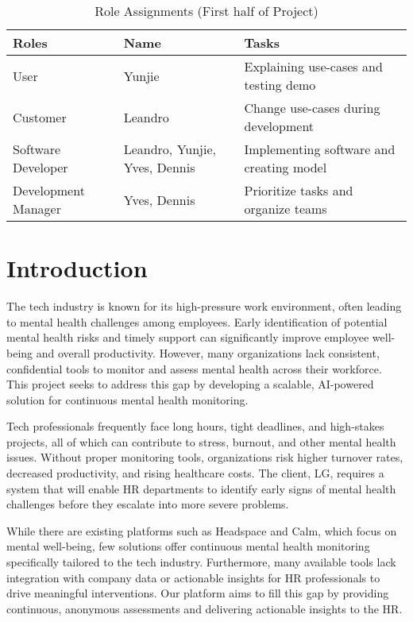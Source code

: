 \documentclass[conference]{IEEEtran}
\begin{document}
\begin{table}[htbp]
    \caption{Role Assignments (First half of Project)}
    \centering
    \begin{tabular}{|p{1.8cm}|p{0.9cm}|p{4.8cm}|}
        \hline
        \textbf{Roles} & \textbf{Name} & \textbf{Tasks} \\ \hline
        User & Yunjie & Explaining use-cases and testing demo \\ \hline
        Customer & Leandro & Change use-cases during development \\ \hline
        Software Developer & Leandro, Yunjie, Yves, Dennis & Implementing software and creating model \\ \hline
        Development Manager & Yves, Dennis & Prioritize tasks and organize teams \\ \hline
    \end{tabular}
    \label{tab:role_assignments}
\end{table}


\section{Introduction}
The tech industry is known for its high-pressure work environment, 
often leading to mental health challenges among employees. 
Early identification of potential mental health risks and timely 
support can significantly improve employee well-being and overall 
productivity. However, many organizations lack consistent, 
confidential tools to monitor and assess mental health across their 
workforce. This project seeks to address this gap by developing a 
scalable, AI-powered solution for continuous mental health monitoring.

Tech professionals frequently face long hours, tight
deadlines, and high-stakes projects, all of which can
contribute to stress, burnout, and other mental health issues.
Without proper monitoring tools, organizations risk higher
turnover rates, decreased productivity, and rising healthcare
costs. The client, LG, requires a system that will enable HR
departments to identify early signs of mental health challenges
before they escalate into more severe problems.\newline

While there are existing platforms such as Headspace and
Calm, which focus on mental well-being, few solutions offer
continuous mental health monitoring specifically tailored to
the tech industry. Furthermore, many available tools lack
integration with company data or actionable insights for HR
professionals to drive meaningful interventions. Our platform
aims to fill this gap by providing continuous, anonymous
assessments and delivering actionable insights to the HR.
\newline
\end{document}
